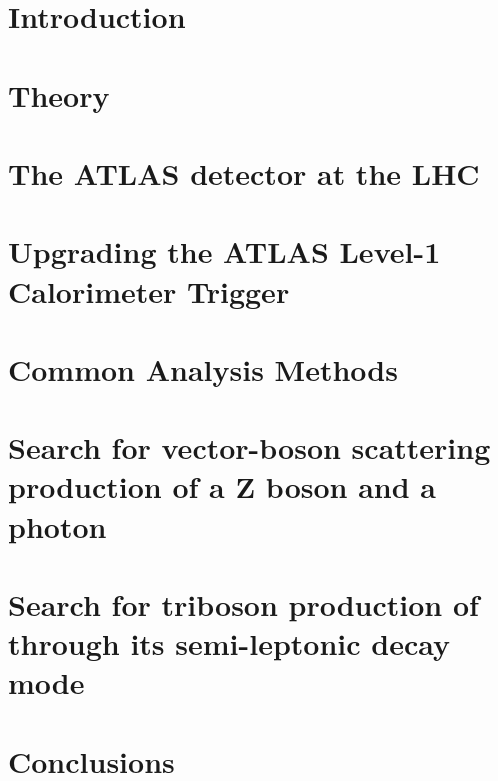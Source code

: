 \newcommand\relpath[1]{#1}
\newcommand\inputchapter[1]{}
\newcommand\resource[1]{#1}
\chapter{Introduction}
\inputchapter{introduction}

\chapter{Theory}
\inputchapter{theory}

\chapter{The ATLAS detector at the \acl{LHC}}
\inputchapter{detector}

\chapter{Upgrading the ATLAS Level-1 Calorimeter Trigger}
\inputchapter{l1calo}

\chapter{Common Analysis Methods}
\inputchapter{analysis-common}

\chapter{Search for vector-boson scattering production of a Z boson and a photon}
\inputchapter{vbs}

\chapter{Search for triboson production of \VZy through its semi-leptonic decay mode}
\inputchapter{vzy}

\chapter{Conclusions}
\inputchapter{conclusion}
